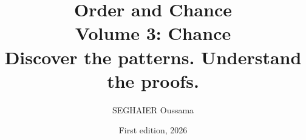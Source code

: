 \documentclass[11pt,openany]{book}
\title{\Huge\textbf{Order and Chance}\\[0.4em]\LARGE Volume 3: Chance\\[0.6em]
\Large Discover the patterns. Understand the proofs.}
\author{SEGHAIER Oussama}
\date{First edition, 2026}
\begin{document}
\frontmatter
\makecover
\maketitle

\tableofcontents

\mainmatter















\appendix


\end{document}
